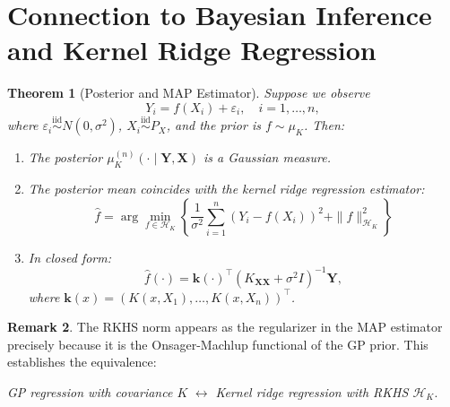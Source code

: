 \documentclass[11pt]{article}
\newtheorem{theorem}{Theorem}[section]
\theoremstyle{definition}
\newtheorem{remark}[theorem]{Remark}
\newcommand{\HK}{\mathcal{H}_K}
\newcommand{\iid}{\stackrel{\mathrm{iid}}{\sim}}
\newcommand{\norm}[1]{\| #1 \|}
\begin{document}
\section{Connection to Bayesian Inference and Kernel Ridge Regression}

\begin{theorem}[Posterior and MAP Estimator]
\label{thm:posterior}
Suppose we observe
\begin{equation}
    Y_i = f(X_i) + \varepsilon_i, \quad i = 1, \ldots, n,
\end{equation}
where $\varepsilon_i \iid N(0, \sigma^2)$, $X_i \iid P_X$, and the prior is $f \sim \mu_K$. Then:

\begin{enumerate}[label=(\roman*)]
    \item The posterior $\mu_K^{(n)}(\cdot \mid \mathbf{Y}, \mathbf{X})$ is a Gaussian measure.
    
    \item The posterior mean coincides with the kernel ridge regression estimator:
    \begin{equation}
        \boxed{
        \hat{f} = \arg\min_{f \in \HK} \left\{ \frac{1}{\sigma^2} \sum_{i=1}^n (Y_i - f(X_i))^2 + \norm{f}_{\HK}^2 \right\}
        }
    \end{equation}
    
    \item In closed form:
    \begin{equation}
        \hat{f}(\cdot) = \mathbf{k}(\cdot)^\top (K_{\mathbf{X}\mathbf{X}} + \sigma^2 I)^{-1} \mathbf{Y},
    \end{equation}
    where $\mathbf{k}(x) = (K(x, X_1), \ldots, K(x, X_n))^\top$.
\end{enumerate}
\end{theorem}

\begin{remark}
The RKHS norm appears as the regularizer in the MAP estimator precisely because it is the Onsager-Machlup functional of the GP prior. This establishes the equivalence:
\begin{center}
\emph{GP regression with covariance $K$} $\longleftrightarrow$ \emph{Kernel ridge regression with RKHS $\HK$}.
\end{center}
\end{remark}
\end{document}
